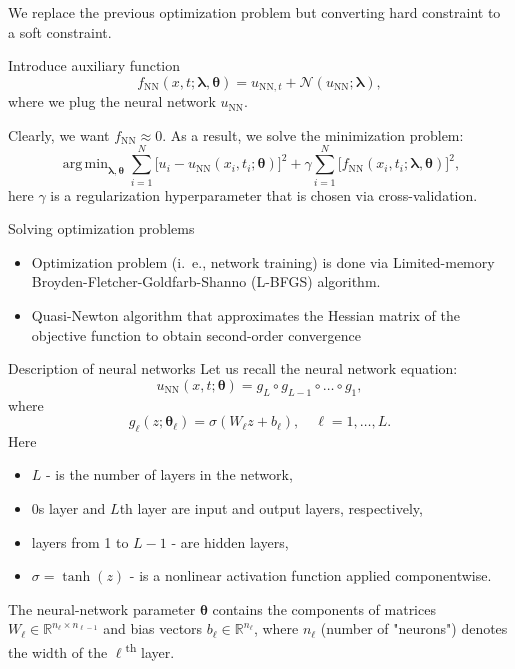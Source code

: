 \documentclass{beamer}
\renewcommand{\vec}[1]{\boldsymbol{#1}}
\newcommand{\VTheta}{\ensuremath{\vec{\theta}}}
\newcommand{\VLambda}{\ensuremath{\vec{\lambda}}}
\DeclareMathOperator*{\argmin}{arg\,min}
\newcommand{\R}{\mathbb R}
\newcommand{\UNN}[1][\text{NN}]{u_{#1}}
\newcommand{\FNN}[1][\text{NN}]{f_{#1}}
\newcommand{\NonlinOp}{\mathcal N\!}
\begin{document}
\begin{frame}
We replace the previous optimization problem but converting hard constraint
to a soft constraint.

Introduce auxiliary function
\begin{equation*}
    \FNN(x, t; \VLambda, \VTheta) =
        u_{\text{NN}, t} + \NonlinOp(u_{\text{NN}}; \VLambda),
\end{equation*}
where we plug the neural network $\UNN$.

\vspace{0.5cm}
Clearly, we want $\FNN \approx 0$.
As a result, we solve the minimization problem:
\begin{equation*}
    \argmin_{\VLambda, \VTheta}
    \sum_{i=1}^N \big[ u_i - \UNN(x_i, t_i; \VTheta)\big ]^2
    +\gamma \sum_{i=1}^N \big[ \FNN(x_i, t_i; \VLambda, \VTheta) \big]^2,
\end{equation*}
here $\gamma$ is a regularization hyperparameter that is chosen via cross-validation.
    
\end{frame}

\begin{frame}{Solving optimization problems}
\begin{itemize}
    \item Optimization problem (i.\ e., network training) is done via Limited-memory
Broyden-Fletcher-Goldfarb-Shanno (L-BFGS) algorithm.

    \item Quasi-Newton algorithm that approximates the Hessian matrix of the objective
function to obtain second-order convergence
\end{itemize}
\end{frame}

\begin{frame}{Description of neural networks}
\small    
Let us recall the neural network equation:
$$
\UNN(x, t; \vec{\theta}) = g_L \circ g_{L-1} \circ \dots \circ g_1,
$$
where
\[
    g_\ell(z; \VTheta_\ell) = \sigma (W_\ell z + b_\ell), \quad \ell = 1,\dots,L.
\]
Here 
\begin{itemize}
    \item $L$  - is the number of layers in the network,
    \item 0s layer and $L$th layer are input and output layers, respectively,
    \item layers from 1 to $L-1$ - are hidden layers,
    \item $\sigma = \tanh (z) $ - is a nonlinear activation function applied componentwise.
\end{itemize} 
 
The neural-network parameter $\VTheta$ contains the components of matrices
$W_\ell \in \R^{n_{\ell}\times n_{\ell-1}}$ and bias vectors
$b_\ell \in \R^{n_\ell}$, where $n_\ell$  (number of "neurons") denotes the width of the
$\ell$\textsuperscript{th} layer.
    
\end{frame}
\end{document}
